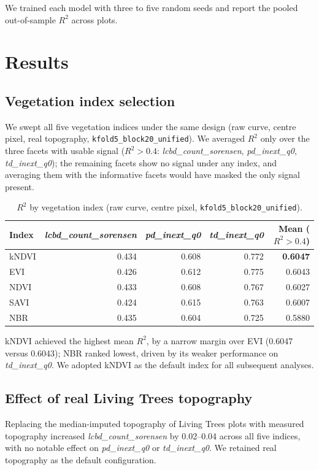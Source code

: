 \documentclass[11pt]{article}
\begin{document}
We trained each model with three to five random seeds and report the pooled
out-of-sample $R^2$ across plots.

\section{Results}

\subsection{Vegetation index selection}

We swept all five vegetation indices under the same design (raw curve, centre pixel,
real topography, \texttt{kfold5\_block20\_unified}). We averaged $R^2$ only over the
three facets with usable signal ($R^2 > 0.4$: \emph{lcbd\_count\_sorensen},
\emph{pd\_inext\_q0}, \emph{td\_inext\_q0}); the remaining facets show no signal under
any index, and averaging them with the informative facets would have masked the only
signal present.

\begin{table}[h]
\centering
\begin{tabular}{lrrrr}
\toprule
Index & \emph{lcbd\_count\_sorensen} & \emph{pd\_inext\_q0} & \emph{td\_inext\_q0} & Mean ($R^2>0.4$) \\
\midrule
kNDVI & 0.434 & 0.608 & 0.772 & \textbf{0.6047} \\
EVI   & 0.426 & 0.612 & 0.775 & 0.6043 \\
NDVI  & 0.433 & 0.608 & 0.767 & 0.6027 \\
SAVI  & 0.424 & 0.615 & 0.763 & 0.6007 \\
NBR   & 0.435 & 0.604 & 0.725 & 0.5880 \\
\bottomrule
\end{tabular}
\caption{$R^2$ by vegetation index (raw curve, centre pixel, \texttt{kfold5\_block20\_unified}).}
\end{table}

kNDVI achieved the highest mean $R^2$, by a narrow margin over EVI (0.6047 versus
0.6043); NBR ranked lowest, driven by its weaker performance on \emph{td\_inext\_q0}. We
adopted kNDVI as the default index for all subsequent analyses.

\subsection{Effect of real Living Trees topography}

Replacing the median-imputed topography of Living Trees plots with measured topography
increased \emph{lcbd\_count\_sorensen} by 0.02--0.04 across all five indices, with no
notable effect on \emph{pd\_inext\_q0} or \emph{td\_inext\_q0}. We retained real
topography as the default configuration.
\end{document}
